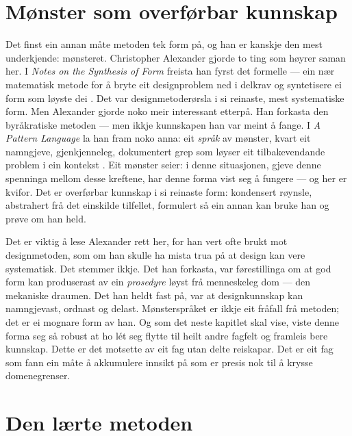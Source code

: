 \section{Mønster som overførbar kunnskap}

Det finst ein annan måte metoden tek form på, og han er kanskje den mest underkjende: mønsteret. Christopher Alexander gjorde to ting som høyrer saman her. I \textit{Notes on the Synthesis of Form} freista han fyrst det formelle — ein nær matematisk metode for å bryte eit designproblem ned i delkrav og syntetisere ei form som løyste dei \autocite{alexander1964notes}. Det var designmetoderørsla i si reinaste, mest systematiske form. Men Alexander gjorde noko meir interessant etterpå. Han forkasta den byråkratiske metoden — men ikkje kunnskapen han var meint å fange. I \textit{A Pattern Language} la han fram noko anna: eit \emph{språk} av mønster, kvart eit namngjeve, gjenkjenneleg, dokumentert grep som løyser eit tilbakevendande problem i ein kontekst \autocite{alexander1977pattern}. Eit mønster seier: i denne situasjonen, gjeve denne spenninga mellom desse kreftene, har denne forma vist seg å fungere — og her er kvifor. Det er overførbar kunnskap i si reinaste form: kondensert røynsle, abstrahert frå det einskilde tilfellet, formulert så ein annan kan bruke han og prøve om han held.

Det er viktig å lese Alexander rett her, for han vert ofte brukt mot designmetoden, som om han skulle ha mista trua på at design kan vere systematisk. Det stemmer ikkje. Det han forkasta, var førestillinga om at god form kan produserast av ein \emph{prosedyre} løyst frå menneskeleg dom — den mekaniske draumen. Det han heldt fast på, var at designkunnskap kan namngjevast, ordnast og delast. Mønsterspråket er ikkje eit fråfall frå metoden; det er ei mognare form av han. Og som det neste kapitlet skal vise, viste denne forma seg så robust at ho lét seg flytte til heilt andre fagfelt og framleis bere kunnskap. Dette er det motsette av eit fag utan delte reiskapar. Det er eit fag som fann ein måte å akkumulere innsikt på som er presis nok til å krysse domenegrenser.

\section{Den lærte metoden}

